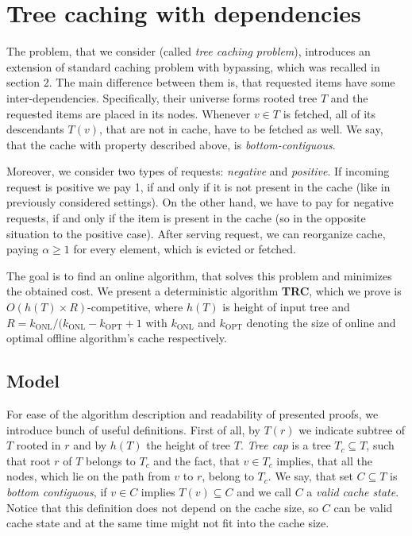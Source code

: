 \section{Tree caching with dependencies}
\label{tree_caching_algo}
The problem, that we consider (called \textit{tree caching problem}), 
introduces an extension of standard caching problem with bypassing, 
which was recalled in section 2. The main difference between them is, that 
requested items have some inter-dependencies. Specifically, their 
universe forms rooted tree $T$ and the requested items are placed in its nodes. 
Whenever $v \in T$ is fetched, all of its descendants $T(v)$, that are not 
in cache, have to be fetched as well. We say, that the cache with property 
described above, is \textit{bottom-contiguous}.

Moreover, we consider two types of requests: \textit{negative} and 
\textit{positive}. If incoming request is positive we pay 1, if and only if 
it is not present in the cache (like in previously considered settings). On the 
other hand, we have to pay for negative requests, if and only if the item is 
present in the cache (so in the opposite situation to the positive case). After 
serving request, we can reorganize cache, paying $\alpha \geq 1$ for every 
element, which is evicted or fetched. 

The goal is to find an online algorithm, that solves this problem and minimizes 
the obtained cost. We present a deterministic algorithm \textbf{TRC}, which 
we prove is $O(h(T) \times R)$-competitive, where $h(T)$ is height of input tree 
and $R = k_{\mathrm{ONL}}/(k_{\mathrm{ONL}} - k_{\mathrm{OPT}} +1$ with 
$k_{\mathrm{ONL}}$ and $k_{\mathrm{OPT}}$ denoting the size of 
online and optimal offline algorithm's cache respectively.

\subsection{Model}

For ease of the algorithm description and readability of presented proofs, 
we introduce bunch of useful definitions. First of all, by $T(r)$ we indicate 
subtree of $T$ rooted in $r$ and by $h(T)$ the height of tree $T$. 
\textit{Tree cap} is a tree $T_c \subseteq T$, such that root $r$ of $T$ belongs
to $T_c$ and the fact, that $v \in T_c$ 
implies, that all the nodes, which lie on the path from $v$ to $r$, belong to $T_c$. 
We say, that set $C \subseteq T$ is \textit{bottom contiguous}, if $v \in C$ implies 
$T(v) \subseteq C$ and we call $C$ a \textit{valid cache state}. Notice that this 
definition does not depend on the cache size, so $C$ can be valid cache state and at 
the same time might not fit into the cache size.

